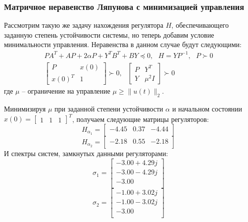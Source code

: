 \subsubsection{Матричное неравенство Ляпунова с минимизацией управления}
Рассмотрим такую же задачу нахождения регулятора $H$, обеспечивающего заданную степень устойчивости 
системы, но теперь добавим условие минимальности управления. Неравенства в данном случае 
будут следующими:
\begin{equation}
    \begin{array}{cc}
        PA^T + AP + 2\alpha P + Y^T B^T + BY \preceq 0, ~~~ H = Y P^{-1}, ~~~ P \succ 0 \\ 
        \begin{bmatrix}
            P & x(0) \\
            x(0)^T & 1
        \end{bmatrix} \succ 0, ~~~ \begin{bmatrix}
            P & Y^T \\
            Y & \mu^2I
        \end{bmatrix} \succ 0
    \end{array}
\end{equation} 
где $\mu$ -- ограничение на управление $\mu \ge \|u(t)\|_2$.

Минимизируя $\mu$ при заданной степени устойчивости $\alpha$ и начальном 
состоянии $x(0) = \begin{bmatrix}1 & 1 & 1\end{bmatrix}^T$, получаем следующие 
матрицы регуляторов:
\begin{equation}
    H_{\alpha_1} = \begin{bmatrix}
        -4.45  & 0.37  & -4.44 \\ 
    \end{bmatrix}
\end{equation}
\begin{equation}
    H_{\alpha_2} = \begin{bmatrix}
        -2.18  & 0.55  & -2.18 \\ 
    \end{bmatrix}
\end{equation}
И спектры систем, замкнутых данными регуляторами:
\begin{equation}
    \sigma_1 = \begin{bmatrix}
        -3.00 + 4.29j \\ 
        -3.00 - 4.29j \\ 
        -3.00 \\ 
    \end{bmatrix}
\end{equation}
\begin{equation}
    \sigma_2 = \begin{bmatrix}
        -1.00 + 3.02j \\ 
        -1.00 - 3.02j \\ 
        -3.00 \\ 
    \end{bmatrix}
\end{equation}

